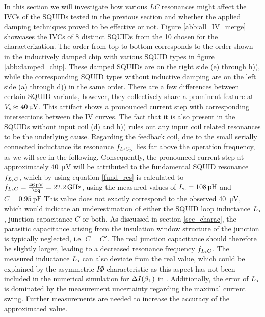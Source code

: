 In this section we will investigate how various \textit{LC} resonances might affect the IVCs of the SQUIDs tested in the previous section and whether the applied damping techniques proved to be effective or not. Figure \ref{abb:all_IV_merge} showcases the IVCs of 8 distinct SQUIDs from the 10 chosen for the characterization. The order from top to bottom corresponds to the order shown in the inductively damped chip with various SQUID types in figure \ref{abb:damped_chip}. These damped SQUIDs are on the right side (e) through h)), while the corresponding SQUID types without inductive damping are on the left side (a) through d)) in the same order. There are a few differences between certain SQUID variants, however, they collectively share a prominent feature at $V_{\rm s}\approx\qty{40}{\uV}$. This artifact shows a pronounced current step with corresponding intersections between the IV curves. The fact that it is also present in the SQUIDs without input coil (d) and h)) rules out any input coil related resonances to be the underlying cause. Regarding the feedback coil, due to the small serially connected inductance its resonance $f_{L_{\rm f}C_{\rm p}}$ lies far above the operation frequency, as we will see in the following. Consequently, the pronounced current step at approximately \qty{40}{\uV} will be attributed to the fundamental SQUID resonance $f_{L_{\rm s}C}$, which by using equation \ref{fund_res} is calculated to $f_{L_{\rm s}C}=\frac{\qty{46}{\uV}}{\unit{\fq}}=\qty{22.2}{\GHz}$, using the measured values of $L_{\rm s}=\qty{108}{\pH}$ and $C=\qty{0.95}{\pF}$ This value does not exactly correspond to the observed \qty{40}{\uV}, which would indicate an underestimation of either the SQUID loop inductance $L_{\rm s}$, junction capacitance $C$ or both. As discussed in section \ref{sec_charac}, the parasitic capacitance arising from the insulation window structure of the junction is typically neglected, i.e. $C=C'$. The real junction capacitance should therefore be slightly larger, leading to a decreased resonance frequency $f_{L_{\rm s}C}$. The measured inductance $L_{\rm s}$ can also deviate from the real value, which could be explained by the asymmetric $I\Phi$ characteristic as this aspect has not been included in the numerical simulation for $\Delta I(\beta_{\rm L})$ in \cite{Tesche1977}. Additionally, the error of $L_{\rm s}$ is dominated by the measurement uncertainty regarding the maximal current swing. Further measurements are needed to increase the accuracy of the approximated value.\\
